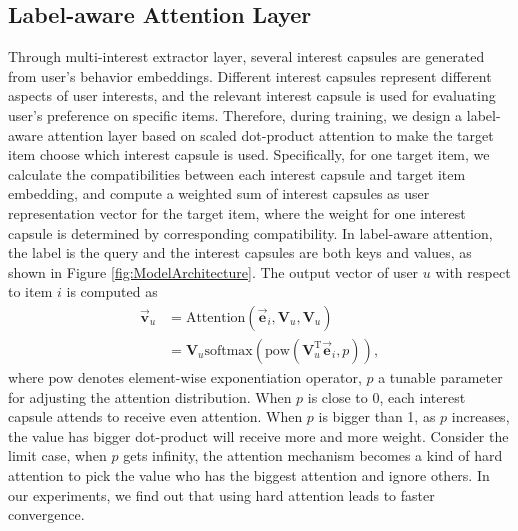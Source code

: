\documentclass[sigconf]{acmart}
\begin{document}
\subsection{Label-aware Attention Layer}
Through multi-interest extractor layer, several interest capsules are generated from user's behavior embeddings.
Different interest capsules represent different aspects of user interests, and the relevant interest capsule is used for evaluating user's preference on specific items.
Therefore, during training, we design a label-aware attention layer based on scaled dot-product attention \cite{vaswani2017attention} to make the target item choose which interest capsule is used.
Specifically, for one target item, we calculate the compatibilities between each interest capsule and target item embedding, and compute a weighted sum of interest capsules as user representation vector for the target item, where the weight for one interest capsule is determined by corresponding compatibility.
In label-aware attention, the label is the query and the interest capsules are both keys and values, as shown in Figure \ref{fig:ModelArchitecture}.
The output vector of user $u$ with respect to item $i$ is computed as
\begin{align*}
\overrightarrow{\boldsymbol{v}}_u
&= \text{Attention} \left( \overrightarrow{\boldsymbol{e}}_i, \boldsymbol{\textrm{V}}_u, \boldsymbol{\textrm{V}}_u \right) \\
&=  \boldsymbol{\textrm{V}}_u \text{softmax}(\text{pow}(\boldsymbol{\textrm{V}}_u^{\textrm{T}}\overrightarrow{\boldsymbol{e}}_i, p)),
\end{align*}
where $\text{pow}$ denotes element-wise exponentiation operator, $p$ a tunable parameter for adjusting the attention distribution.
When $p$ is close to 0, each interest capsule attends to receive even attention.
When $p$ is bigger than 1, as $p$ increases, the value has bigger dot-product will receive more and more weight.
Consider the limit case, when $p$ gets infinity, the attention mechanism becomes a kind of hard attention to pick the value who has the biggest attention and ignore others.
In our experiments, we find out that using hard attention leads to faster convergence.
\end{document}
